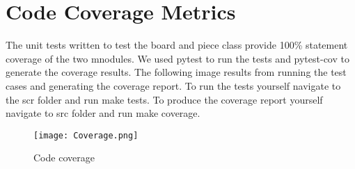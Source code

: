 \documentclass[12pt, titlepage]{article}
\begin{document}
\section{Code Coverage Metrics}
The unit tests written to test the board and piece class provide 100\% statement coverage of the two mnodules. We used pytest to run the tests and pytest-cov to generate the coverage results. The following image results from running the test cases and generating the coverage report. To run the tests yourself navigate to the scr folder and run make tests. To produce the coverage report yourself navigate to src folder and run make coverage.

\begin{figure}[H]
\centering
\texttt{[image: Coverage.png]}
\caption{Code coverage}
\label{FigUH}
\end{figure}
% 

% 
\end{document}
